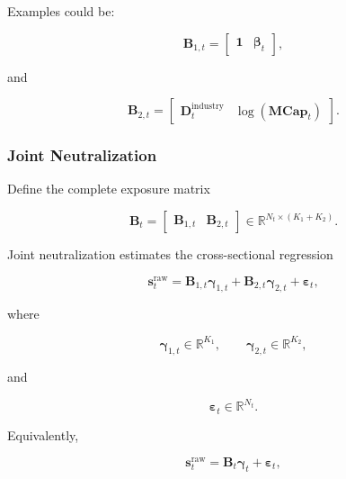 \documentclass[11pt,a4paper]{article}
\begin{document}
Examples could be:

\begin{equation}
\mathbf{B}_{1,t}
=
\begin{bmatrix}
\mathbf{1}
&
\boldsymbol{\beta}_t
\end{bmatrix},
\end{equation}

and

\begin{equation}
\mathbf{B}_{2,t}
=
\begin{bmatrix}
\mathbf{D}_t^{\mathrm{industry}}
&
\log(\mathbf{MCap}_t)
\end{bmatrix}.
\end{equation}


\subsubsection{Joint Neutralization}

Define the complete exposure matrix

\begin{equation}
\boxed{
\mathbf{B}_t
=
\begin{bmatrix}
\mathbf{B}_{1,t}
&
\mathbf{B}_{2,t}
\end{bmatrix}
\in
\mathbb{R}^{N_t\times(K_1+K_2)}.
}
\end{equation}

Joint neutralization estimates the cross-sectional regression

\begin{equation}
\boxed{
\mathbf{s}_t^{\mathrm{raw}}
=
\mathbf{B}_{1,t}
\boldsymbol{\gamma}_{1,t}
+
\mathbf{B}_{2,t}
\boldsymbol{\gamma}_{2,t}
+
\boldsymbol{\varepsilon}_t,
}
\end{equation}

where

\begin{equation}
\boldsymbol{\gamma}_{1,t}
\in
\mathbb{R}^{K_1},
\qquad
\boldsymbol{\gamma}_{2,t}
\in
\mathbb{R}^{K_2},
\end{equation}

and

\begin{equation}
\boldsymbol{\varepsilon}_t
\in
\mathbb{R}^{N_t}.
\end{equation}

Equivalently,

\begin{equation}
\mathbf{s}_t^{\mathrm{raw}}
=
\mathbf{B}_t
\boldsymbol{\gamma}_t
+
\boldsymbol{\varepsilon}_t,
\end{equation}
\end{document}
